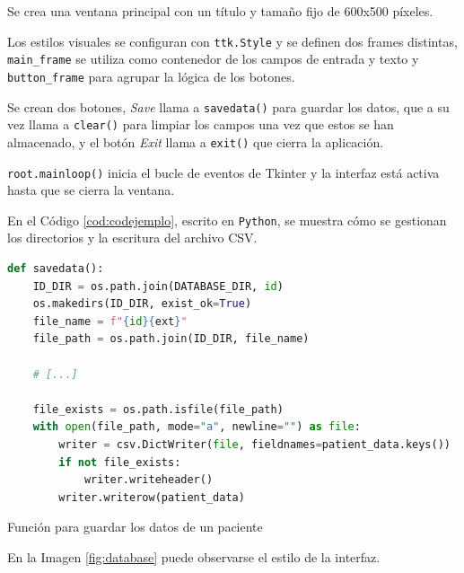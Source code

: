 Se crea una ventana principal con un título y tamaño fijo de 600x500 píxeles.

Los estilos visuales se configuran con \verb|ttk.Style| y se definen dos frames distintas, \verb|main_frame| se utiliza como contenedor de los campos de entrada y texto y \verb|button_frame| para agrupar la lógica de los botones.

Se crean dos botones, \textit{Save} llama a \verb|savedata()| para guardar los datos, que a su vez llama a \verb|clear()| para limpiar los campos una vez que estos se han almacenado, y el botón \textit{Exit} llama a \verb|exit()| que cierra la aplicación.

\verb|root.mainloop()| inicia el bucle de eventos de Tkinter y la interfaz está activa hasta que se cierra la ventana.

En el Código \ref{cod:codejemplo}, escrito en \texttt{Python}, se muestra cómo se gestionan los directorios y la escritura del archivo CSV.

\begin{code}[h]
\begin{lstlisting}[language=Python]
def savedata():
    ID_DIR = os.path.join(DATABASE_DIR, id)
    os.makedirs(ID_DIR, exist_ok=True)
    file_name = f"{id}{ext}"
    file_path = os.path.join(ID_DIR, file_name)

    # [...]

    file_exists = os.path.isfile(file_path)
    with open(file_path, mode="a", newline="") as file:
        writer = csv.DictWriter(file, fieldnames=patient_data.keys())
        if not file_exists:
            writer.writeheader()
        writer.writerow(patient_data)
\end{lstlisting}
\caption[Función para guardar los datos de un paciente]{Función para guardar los datos de un paciente}
\label{cod:codejemplo}
\end{code}

En la Imagen \ref{fig:database} puede observarse el estilo de la interfaz.

